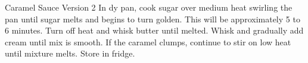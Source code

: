 \documentclass[../cookbook.tex]{subfiles}
\begin{document}
\begin{recipe}{Caramel Sauce Version 2}{}{}
    In dy pan, cook sugar over medium heat swirling the pan until sugar melts
    and begins to turn golden. This will be approximately 5 to 6 minutes.
    Turn off heat and whisk butter until melted.
    Whisk and gradually add cream until mix is smooth. If the caramel clumps,
    continue to stir on low heat until mixture melts. Store in fridge.
\end{recipe}
\end{document}
